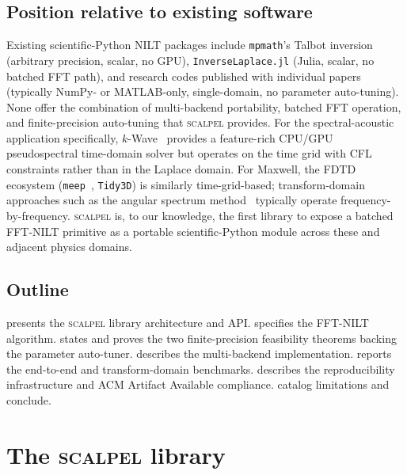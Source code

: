 \documentclass[manuscript,review]{acmart}
\newcommand{\scalpel}{\textsc{scalpel}}
\begin{document}
\subsection{Position relative to existing software}

Existing scientific-Python NILT packages include \texttt{mpmath}'s
Talbot inversion (arbitrary precision, scalar, no GPU),
\texttt{InverseLaplace.jl} (Julia, scalar, no batched FFT path), and
research codes published with individual papers (typically NumPy- or
MATLAB-only, single-domain, no parameter auto-tuning). None offer the
combination of multi-backend portability, batched FFT operation, and
finite-precision auto-tuning that \scalpel{} provides. For the
spectral-acoustic application specifically, $k$-Wave~\cite{treeby2010}
provides a feature-rich CPU/GPU pseudospectral time-domain solver but
operates on the time grid with CFL constraints rather than in the
Laplace domain. For Maxwell, the FDTD ecosystem
(\texttt{meep}~\cite{oskooi2010}, \texttt{Tidy3D}) is similarly
time-grid-based; transform-domain approaches such as the angular
spectrum method~\cite{goodman2005} typically operate
frequency-by-frequency. \scalpel{} is, to our knowledge, the first
library to expose a batched FFT-NILT primitive as a portable
scientific-Python module across these and adjacent physics domains.

\subsection{Outline}

 presents the \scalpel{} library architecture and
API.  specifies the FFT-NILT algorithm.
 states and proves the two finite-precision
feasibility theorems backing the parameter auto-tuner.
 describes the multi-backend implementation.
 reports the end-to-end and transform-domain
benchmarks.  describes the reproducibility
infrastructure and ACM Artifact Available compliance.
 catalog limitations and
conclude.

\section{The \textsc{scalpel} library}\label{sec:library}
\end{document}
